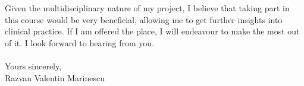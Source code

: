 \documentclass[12pt,a4paper,oneside]{report}
\begin{document}
Given the multidisciplinary nature of my project, I believe that taking part in this course would be very beneficial, allowing me to get further insights into clinical practice. If I am offered the place, I will endeavour to make the most out of it. I look forward to hearing from you.\\\\

Yours sincerely,\\

Razvan Valentin Marinescu
\end{document}
